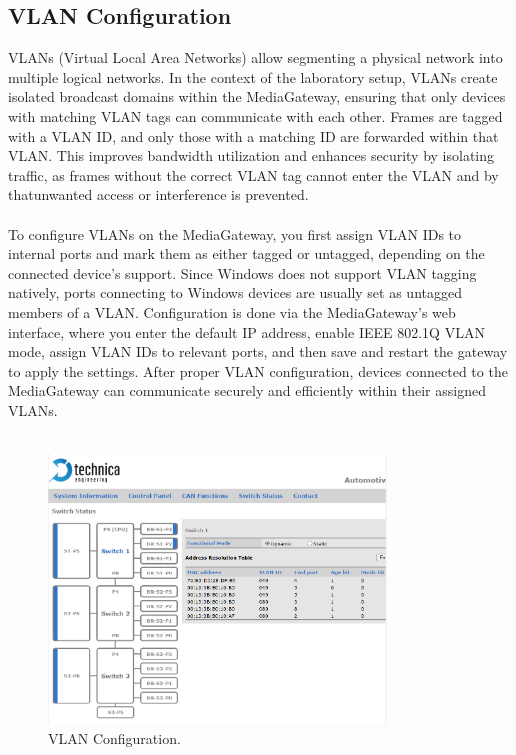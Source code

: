 \subsection{VLAN Configuration}
VLANs (Virtual Local Area Networks) allow segmenting a physical network into multiple logical networks. In the context of the laboratory setup, VLANs create isolated broadcast domains within the MediaGateway, ensuring that only devices with matching VLAN tags can communicate with each other. Frames are tagged with a VLAN ID, and only those with a matching ID are forwarded within that VLAN. This improves bandwidth utilization and enhances security by isolating traffic, as frames without the correct VLAN tag cannot enter the VLAN and by thatunwanted access or interference is prevented.\\\\
To configure VLANs on the MediaGateway, you first assign VLAN IDs to internal ports and mark them as either tagged or untagged, depending on the connected device’s support. Since Windows does not support VLAN tagging natively, ports connecting to Windows devices are usually set as untagged members of a VLAN. Configuration is done via the MediaGateway’s web interface, where you enter the default IP address, enable IEEE 802.1Q VLAN mode, assign VLAN IDs to relevant ports, and then save and restart the gateway to apply the settings. After proper VLAN configuration, devices connected to the MediaGateway can communicate securely and efficiently within their assigned VLANs.\\\\
\begin{figure}[h]
    \centering
     \includegraphics[width=0.8\textwidth]{figures/pictures/vlanconfig.PNG}
    \caption{VLAN Configuration.}
    \label{fig:mediagateway_setup}
\end{figure}
